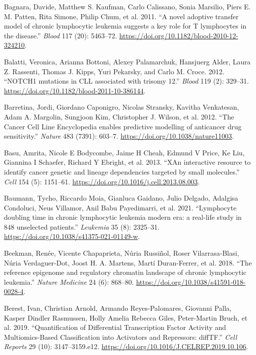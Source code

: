 \documentclass[11pt, a4paper, twosided]{book}
\newenvironment{CSLReferences}%
  {}%
  {\par}
\begin{document}
\begin{CSLReferences}{1}{0}
\leavevmode{}%
Bagnara, Davide, Matthew S. Kaufman, Carlo Calissano, Sonia Marsilio, Piers E. M. Patten, Rita Simone, Philip Chum, et al. 2011. {``{A novel adoptive transfer model of chronic lymphocytic leukemia suggests a key role for T lymphocytes in the disease}.''} \emph{Blood} 117 (20): 5463--72. \url{https://doi.org/10.1182/blood-2010-12-324210}.

\leavevmode{}%
Balatti, Veronica, Arianna Bottoni, Alexey Palamarchuk, Hansjuerg Alder, Laura Z. Rassenti, Thomas J. Kipps, Yuri Pekarsky, and Carlo M. Croce. 2012. {``{NOTCH1 mutations in CLL associated with trisomy 12}.''} \emph{Blood} 119 (2): 329--31. \url{https://doi.org/10.1182/blood-2011-10-386144}.

\leavevmode{}%
Barretina, Jordi, Giordano Caponigro, Nicolas Stransky, Kavitha Venkatesan, Adam A. Margolin, Sungjoon Kim, Christopher J. Wilson, et al. 2012. {``{The Cancer Cell Line Encyclopedia enables predictive modelling of anticancer drug sensitivity}.''} \emph{Nature} 483 (7391): 603--7. \url{https://doi.org/10.1038/nature11003}.

\leavevmode{}%
Basu, Amrita, Nicole E Bodycombe, Jaime H Cheah, Edmund V Price, Ke Liu, Giannina I Schaefer, Richard Y Ebright, et al. 2013. {``{XAn interactive resource to identify cancer genetic and lineage dependencies targeted by small molecules}.''} \emph{Cell} 154 (5): 1151--61. \url{https://doi.org/10.1016/j.cell.2013.08.003}.

\leavevmode{}%
Baumann, Tycho, Riccardo Moia, Gianluca Gaidano, Julio Delgado, Adalgisa Condoluci, Neus Villamor, Anil Babu Payedimarri, et al. 2021. {``{Lymphocyte doubling time in chronic lymphocytic leukemia modern era: a real-life study in 848 unselected patients}.''} \emph{Leukemia} 35 (8): 2325--31. \url{https://doi.org/10.1038/s41375-021-01149-w}.

\leavevmode{}%
Beekman, Renée, Vicente Chapaprieta, Núria Russiñol, Roser Vilarrasa-Blasi, Núria Verdaguer-Dot, Joost H. A. Martens, Martí Duran-Ferrer, et al. 2018. {``{The reference epigenome and regulatory chromatin landscape of chronic lymphocytic leukemia}.''} \emph{Nature Medicine} 24 (6): 868--80. \url{https://doi.org/10.1038/s41591-018-0028-4}.

\leavevmode{}%
Berest, Ivan, Christian Arnold, Armando Reyes-Palomares, Giovanni Palla, Kasper Dindler Rasmussen, Holly Amelia Rebecca Giles, Peter-Martin Bruch, et al. 2019. {``{Quantification of Differential Transcription Factor Activity and Multiomics-Based Classification into Activators and Repressors: diffTF}.''} \emph{Cell Reports} 29 (10): 3147--3159.e12. \url{https://doi.org/10.1016/J.CELREP.2019.10.106}.


\end{CSLReferences}
\end{document}
